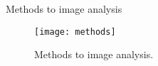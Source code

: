 \begin{frame}[t]{Methods to image analysis} %
    \begin{figure}
        \centering
        \texttt{[image: methods]}
        \caption{Methods to image analysis. \cite{lin2014microsoft}}
    \end{figure}
\end{frame}
